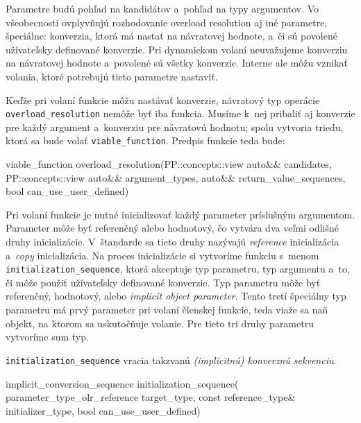 Parametre budú pohľad na kandidátov a~pohľad na typy argumentov. Vo všeobecnosti ovplyvňujú rozhodovanie overload resolution aj iné parametre, špeciálne: konverzia, ktorá má nastať na návratovej hodnote, a~či sú povolené užívateľsky definované konverzie. Pri dynamickom volaní neuvažujeme konverziu na návratovej hodnote a~povolené sú všetky konverzie. Interne ale môžu vznikať volania, ktoré potrebujú tieto parametre nastaviť.

Keďže pri volaní funkcie môžu nastávať konverzie, návratový typ operácie \texttt{overload\_resolution} nemôže byť iba funkcia. Musíme k~nej pribaliť aj konverzie pre každý argument a~konverziu pre návratovú hodnotu; spolu vytvoria triedu, ktorá sa bude volať \texttt{viable\_function}. Predpis funkcie teda bude:
\begin{code}[fontsize=\footnotesize]
viable_function overload_resolution(PP::concepts::view auto&& candidates,
                                    PP::concepts::view auto&& argument_types,
                                    auto&& return_value_sequences,
                                    bool can_use_user_defined)
\end{code}

Pri volaní funkcie je nutné inicializovať každý parameter príslušným argumentom. Parameter môže byť referenčný alebo hodnotový, čo vytvára dva veľmi odlišné druhy inicializácie. V~štandarde sa tieto druhy nazývajú \emph{reference} inicializácia a~\emph{copy} inicializácia. Na proces inicializácie si vytvoríme funkciu s~menom \texttt{initialization\_sequence}, ktorá akceptuje typ parametru, typ argumentu a~to, či môže použiť užívateľsky definované konverzie. Typ parametru môže byť referenčný, hodnotový, alebo \emph{implicit object parameter}. Tento tretí špeciálny typ parametru má prvý parameter pri volaní členskej funkcie, teda viaže sa naň objekt, na ktorom sa uskutočňuje volanie. Pre tieto tri druhy parametru vytvoríme sum typ.

\texttt{initialization\_sequence} vracia takzvanú \emph{(implicitnú) konverznú sekvenciu}.
\begin{code}[fontsize=\footnotesize]
implicit_conversion_sequence initialization_sequence(
    parameter_type_olr_reference target_type,
    const reference_type& initializer_type,
    bool can_use_user_defined)
\end{code}

